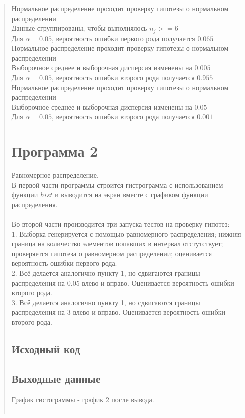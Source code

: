 \documentclass{article}
\begin{document}
\begin{quote}
	Нормальное распределение проходит проверку гипотезы о нормальном распределении \\
	Данные сгруппированы, чтобы выполнялось $n_j >= 6$ \\
	Для $\alpha = 0.05$, вероятность ошибки первого рода получается $0.065$ \\

	Нормальное распределение проходит проверку гипотезы о нормальном распределении \\
	Выборочное среднее и выборочная дисперсия изменены на $0.005$ \\
	Для $\alpha = 0.05$, вероятность ошибки второго рода получается $0.955$ \\

	Нормальное распределение проходит проверку гипотезы о нормальном распределении \\
	Выборочное среднее и выборочная дисперсия изменены на $0.05$ \\
	Для $\alpha = 0.05$, вероятность ошибки второго рода получается $0.001$
\section{Программа 2}
	Равномерное распределение. \\
	В первой части программы строится гистрограмма с использованием функции $hist$ и выводится на экран вместе с графиком функции распределения. \\ \\
	Во второй части производится три запуска тестов на проверку гипотез: \\
	1. Выборка генерируется с помощью равномерного распределения; нижняя граница на количество элементов попавших в интервал отстутствует; проверяется гипотеза о равномерном распределении; оценивается вероятность ошибки первого рода. \\
	2. Всё делается аналогично пункту 1, но сдвигаются границы распределения на 0.05 влево и вправо. Оценивается вероятность ошибки второго рода. \\
	3. Всё делается аналогично пункту 1, но сдвигаются границы распределения на 3 влево и вправо. Оценивается вероятность ошибки второго рода.
\subsection{Исходный код}
	
\subsection{Выходные данные}
	График гистограммы - график 2 после вывода. \\ \\


\end{quote}
\end{document}
